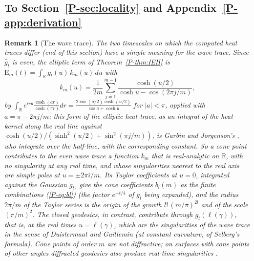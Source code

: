 \documentclass[pdflatex,sn-mathphys-num]{sn-jnl}
\newcommand{\R}{\mathbb{R}}
\newcommand{\pref}[1]{\ref*{P-#1}}%
\theoremstyle{thmstyleone}%
\theoremstyle{thmstylethree}%
\newtheorem{remark}[proposition]{Remark}%
\providecommand{\R}{\mathbb{R}}
\begin{document}
\subsection*{To Section~\pref{sec:locality} and Appendix~\pref{app:derivation}}

\begin{remark}[The wave trace]\label{rem:wave}
The two timescales on which the computed heat traces differ (end of this section) have a simple meaning for the wave trace. Since $\hat g_t$ is even, the elliptic term of Theorem~\pref{thm:IEH} is $\mathrm E_m(t)=\int_\R g_t(u)\,k_m(u)\,du$ with
\[
  k_m(u)=\frac1{2m}\sum_{j=1}^{m-1}\frac{\cosh(u/2)}{\cosh u-\cos(2\pi j/m)},
\]
by $\int_\R e^{iru}\frac{\cosh(ar)}{\cosh(\pi r)}dr=\frac{2\cos(a/2)\cosh(u/2)}{\cos a+\cosh u}$ for $|a|<\pi$, applied with $a=\pi-2\pi j/m$; this form of the elliptic heat trace, as an integral of the heat kernel along the real line against $\cosh(u/2)/(\sinh^2(u/2)+\sin^2(\pi j/m))$, is Garbin and Jorgenson's \cite[Thm~2.5, Rem.~2.6]{garbinjorgenson2020}, who integrate over the half-line, with the corresponding constant. So a cone point contributes to the even wave trace a function $k_m$ that is real-analytic on $\R$, with no singularity at any real time, and whose singularities nearest to the real axis are simple poles at $u=\pm2\pi i/m$. Its Taylor coefficients at $u=0$, integrated against the Gaussian $g_t$, give the cone coefficients $b_l(m)$ as the finite combinations (\pref{eq:bl}) (the factor $e^{-t/4}$ of $g_t$ being expanded), and the radius $2\pi/m$ of the Taylor series is the origin of the growth $l!\,(m/\pi)^{2l}$ and of the scale $(\pi/m)^2$. The closed geodesics, in contrast, contribute through $g_t(\ell(\gamma))$, that is, at the real times $u=\ell(\gamma)$, which are the singularities of the wave trace in the sense of Duistermaat and Guillemin \cite{duistermaatguillemin1975} (at constant curvature, of Selberg's formula). Cone points of order $m$ are not diffractive; on surfaces with cone points of other angles diffracted geodesics also produce real-time singularities \cite{hillairet2005,fordwunsch2017}.
\end{remark}
\end{document}
